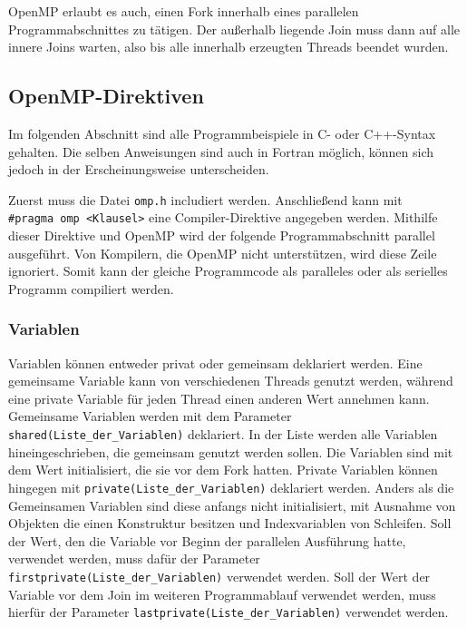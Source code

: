 \documentclass[../main.tex]{subfiles}
\begin{document}
OpenMP erlaubt es auch, einen Fork innerhalb eines parallelen Programmabschnittes zu tätigen. Der außerhalb liegende Join muss dann auf alle innere Joins warten, also bis alle innerhalb erzeugten Threads beendet wurden.

\subsection{OpenMP-Direktiven}

Im folgenden Abschnitt sind alle Programmbeispiele in C- oder C++-Syntax gehalten. Die selben Anweisungen sind auch in Fortran möglich, können sich jedoch in der Erscheinungsweise unterscheiden.

Zuerst muss die Datei \texttt{omp.h} includiert werden. Anschließend kann mit \texttt{\#pragma\ omp\ <Klausel>} eine Compiler-Direktive angegeben werden. Mithilfe dieser Direktive und OpenMP wird der folgende Programmabschnitt parallel ausgeführt. Von Kompilern, die OpenMP nicht unterstützen, wird diese Zeile ignoriert. Somit kann der gleiche Programmcode als paralleles oder als serielles Programm compiliert werden.

\subsubsection{Variablen}

Variablen können entweder privat oder gemeinsam deklariert werden. Eine gemeinsame Variable kann von verschiedenen Threads genutzt werden, während eine private Variable für jeden Thread einen anderen Wert annehmen kann. Gemeinsame Variablen werden mit dem Parameter \texttt{shared(Liste\_der\_Variablen)} deklariert. In der Liste werden alle Variablen hineingeschrieben, die gemeinsam genutzt werden sollen. Die Variablen sind mit dem Wert initialisiert, die sie vor dem Fork hatten. Private Variablen können hingegen mit \texttt{private(Liste\_der\_Variablen)} deklariert werden.  Anders als die Gemeinsamen Variablen sind diese anfangs nicht initialisiert, mit Ausnahme von Objekten die einen Konstruktur besitzen und Indexvariablen von Schleifen.
Soll der Wert, den die Variable vor Beginn der parallelen Ausführung hatte, verwendet werden, muss dafür der Parameter \texttt{firstprivate(Liste\_der\_Variablen)} verwendet werden. Soll der Wert der Variable vor dem Join im weiteren Programmablauf verwendet werden, muss hierfür der Parameter \texttt{lastprivate(Liste\_der\_Variablen)} verwendet werden.
\end{document}
